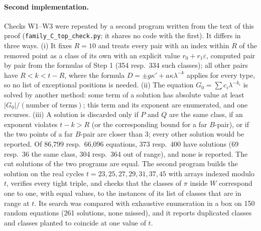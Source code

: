 \documentclass[11pt,a4paper]{article}
\theoremstyle{definition}
\theoremstyle{remark}
\newcommand{\eps}{\varepsilon}
\newcommand{\file}[1]{\texttt{#1}}
\begin{document}
\paragraph{Second implementation.} Checks W1--W3 were repeated by a second program written from the text of this
proof (\file{family\_C\_top\_check.py}; it shares no code with the first). It differs in three ways. (i) It fixes
$R = 10$ and treats every pair with an index within $R$ of the removed point as a class of its own with an explicit
value $r_0 + r_1\eps$, computed pair by pair from the formulas of Step 1 (354 resp.\ 334 such classes); all other
pairs have $R < k < t - R$, where the formula $D = \pm g\kappa' + a\kappa\lambda^{-k}$ applies for every type, so no
list of exceptional positions is needed. (ii) The equation $G_0 = \sum c_i \lambda^{-k_i}$ is solved by another
method: some term of a solution has absolute value at least $|G_0|/(\text{number of terms})$; this term and its
exponent are enumerated, and one recurses. (iii) A solution is discarded only if $P$ and $Q$ are the same class, if
an exponent violates $t - k > R$ (or the corresponding bound for a far $B$-pair), or if the two points of a far
$B$-pair are closer than 3; every other solution would be reported. Of 86,799 resp.\ 66,096 equations, 373 resp.\
400 have solutions (69 resp.\ 36 the same class, 304 resp.\ 364 out of range), and none is reported. The cut
solutions of the two programs are equal. The second program builds the solution on the real cycles
$t = 23, 25, 27, 29, 31, 37, 45$ with arrays indexed modulo $t$, verifies every tight triple, and checks that the
classes of $\pi$ inside $W$ correspond one to one, with equal values, to the instances of its list of classes that
are in range at $t$. Its search was compared with exhaustive enumeration in a box on 150 random equations (261
solutions, none missed), and it reports duplicated classes and classes planted to coincide at one value of $t$.
\end{document}
